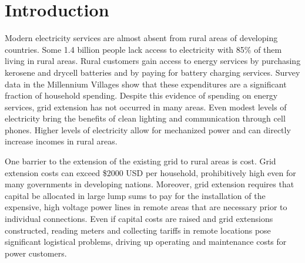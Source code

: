 \documentclass{sig-alternate}
\begin{document}
\section{Introduction}
Modern electricity services are almost absent from rural
areas of developing countries.
Some 1.4 billion people lack access to electricity with 85\% of
them living in rural areas.\cite{WEO2010}
Rural customers gain access to energy services by purchasing
kerosene and drycell batteries and by paying for battery charging
services.
Survey data in the Millennium Villages show that these expenditures
are a significant fraction of household spending.\cite{MVPEnergy}
Despite this evidence of spending on energy services,
grid extension has not occurred in many areas.
Even modest levels of electricity bring the benefits of clean lighting
and communication through cell phones.\cite{Cabraal:2005}
Higher levels of electricity allow for mechanized power and can
directly increase incomes in rural areas.\cite{Kirubi:2009}

One barrier to the extension of the existing grid to rural areas is cost.
Grid extension costs can exceed \$2000 USD per household, prohibitively
high even for many governments in developing
nations.\cite{ModiPlanningKenya}
Moreover, grid extension requires that capital be allocated in large
lump sums to pay for the installation of the expensive, high voltage power
lines in remote areas that are necessary prior to individual connections.
Even if capital costs are raised and grid extensions constructed,
reading meters and collecting tariffs in remote locations pose
significant logistical problems, driving up operating and maintenance
costs for power customers.
\end{document}
